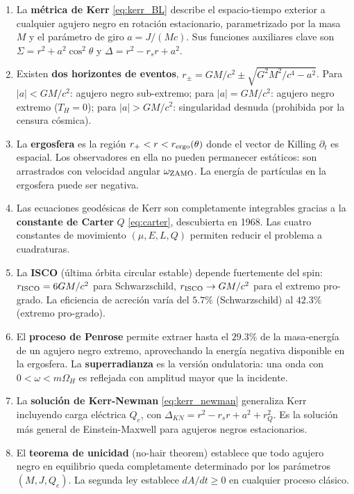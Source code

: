 \begin{enumerate}[leftmargin=2em, label=\textbf{\arabic*.}]

  \item La \textbf{métrica de Kerr} \eqref{eq:kerr_BL} describe el espacio-tiempo exterior a cualquier agujero negro en rotación estacionario, parametrizado por la masa $M$ y el parámetro de giro $a = J/(Mc)$. Sus funciones auxiliares clave son $\Sigma = r^2 + a^2\cos^2\!\theta$ y $\Delta = r^2 - r_s r + a^2$.

  \item Existen \textbf{dos horizontes de eventos}, $r_{\pm} = GM/c^2 \pm \sqrt{G^2M^2/c^4 - a^2}$. Para $|a| < GM/c^2$: agujero negro sub-extremo; para $|a| = GM/c^2$: agujero negro extremo ($T_H = 0$); para $|a| > GM/c^2$: singularidad desnuda (prohibida por la censura cósmica).

  \item La \textbf{ergosfera} es la región $r_+ < r < r_{\rm ergo}(\theta)$ donde el vector de Killing $\partial_t$ es espacial. Los observadores en ella no pueden permanecer estáticos: son arrastrados con velocidad angular $\omega_{\rm ZAMO}$. La energía de partículas en la ergosfera puede ser negativa.

  \item Las ecuaciones geodésicas de Kerr son completamente integrables gracias a la \textbf{constante de Carter} $Q$ \eqref{eq:carter}, descubierta en 1968. Las cuatro constantes de movimiento $(\mu, E, L, Q)$ permiten reducir el problema a cuadraturas.

  \item La \textbf{ISCO} (última órbita circular estable) depende fuertemente del spin: $r_{\rm ISCO} = 6GM/c^2$ para Schwarzschild, $r_{\rm ISCO} \to GM/c^2$ para el extremo pro-grado. La eficiencia de acreción varía del $5.7\%$ (Schwarzschild) al $42.3\%$ (extremo pro-grado).

  \item El \textbf{proceso de Penrose} permite extraer hasta el $29.3\%$ de la masa-energía de un agujero negro extremo, aprovechando la energía negativa disponible en la ergosfera. La \textbf{superradianza} es la versión ondulatoria: una onda con $0 < \omega < m\Omega_H$ es reflejada con amplitud mayor que la incidente.

  \item La \textbf{solución de Kerr-Newman} \eqref{eq:kerr_newman} generaliza Kerr incluyendo carga eléctrica $Q_e$, con $\Delta_{KN} = r^2 - r_s r + a^2 + r_Q^2$. Es la solución más general de Einstein-Maxwell para agujeros negros estacionarios.

  \item El \textbf{teorema de unicidad} (no-hair theorem) establece que todo agujero negro en equilibrio queda completamente determinado por los parámetros $(M, J, Q_e)$. La segunda ley establece $dA/dt \geq 0$ en cualquier proceso clásico.

\end{enumerate}


